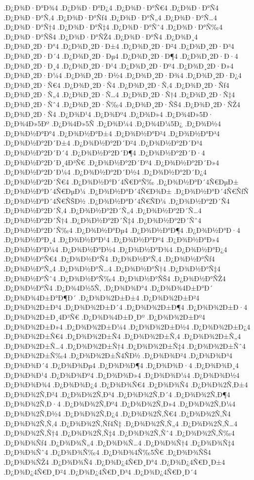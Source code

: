 {.Ð¿Ð¾Ð·Ð°Ð¾4
.Ð¿Ð¾Ð·Ð°Ð¿4
.Ð¿Ð¾Ð·Ð°Ñ€4
.Ð¿Ð¾Ð·Ð°Ñ4
.Ð¿Ð¾Ð·Ð°Ñ‚4
.Ð¿Ð¾Ð·Ð°Ñƒ4
.Ð¿Ð¾Ð·Ð°Ñ„4
.Ð¿Ð¾Ð·Ð°Ñ…4
.Ð¿Ð¾Ð·Ð°Ñ†4
.Ð¿Ð¾Ð·Ð°Ñ‡4
.Ð¿Ð¾Ð·Ð°Ñˆ4
.Ð¿Ð¾Ð·Ð°Ñ‰4
.Ð¿Ð¾Ð·Ð°ÑŠ4
.Ð¿Ð¾Ð·Ð°ÑŽ4
.Ð¿Ð¾Ð·Ð°Ñ4
.Ð¿Ð¾Ð¸4
.Ð¿Ð¾Ð¸2Ð·Ð°4
.Ð¿Ð¾Ð¸2Ð·Ð±4
.Ð¿Ð¾Ð¸2Ð·Ð²4
.Ð¿Ð¾Ð¸2Ð·Ð³4
.Ð¿Ð¾Ð¸2Ð·Ð´4
.Ð¿Ð¾Ð¸2Ð·Ðµ4
.Ð¿Ð¾Ð¸2Ð·Ð¶4
.Ð¿Ð¾Ð¸2Ð·Ð·4
.Ð¿Ð¾Ð¸2Ð·Ð¸4
.Ð¿Ð¾Ð¸2Ð·Ð¹4
.Ð¿Ð¾Ð¸2Ð·Ðº4
.Ð¿Ð¾Ð¸2Ð·Ð»4
.Ð¿Ð¾Ð¸2Ð·Ð¼4
.Ð¿Ð¾Ð¸2Ð·Ð½4
.Ð¿Ð¾Ð¸2Ð·Ð¾4
.Ð¿Ð¾Ð¸2Ð·Ð¿4
.Ð¿Ð¾Ð¸2Ð·Ñ€4
.Ð¿Ð¾Ð¸2Ð·Ñ4
.Ð¿Ð¾Ð¸2Ð·Ñ‚4
.Ð¿Ð¾Ð¸2Ð·Ñƒ4
.Ð¿Ð¾Ð¸2Ð·Ñ„4
.Ð¿Ð¾Ð¸2Ð·Ñ…4
.Ð¿Ð¾Ð¸2Ð·Ñ†4
.Ð¿Ð¾Ð¸2Ð·Ñ‡4
.Ð¿Ð¾Ð¸2Ð·Ñˆ4
.Ð¿Ð¾Ð¸2Ð·Ñ‰4
.Ð¿Ð¾Ð¸2Ð·ÑŠ4
.Ð¿Ð¾Ð¸2Ð·ÑŽ4
.Ð¿Ð¾Ð¸2Ð·Ñ4
.Ð¿Ð¾Ð¹4
.Ð¿Ð¾Ðº4
.Ð¿Ð¾Ð»4
.Ð¿Ð¾4Ð»5Ð·
.Ð¿Ð¾4Ð»5Ðº
.Ð¿Ð¾4Ð»5Ñ
.Ð¿Ð¾Ð¼4
.Ð¿Ð¾4Ð¼5Ð¿
.Ð¿Ð¾Ð½4
.Ð¿Ð¾Ð½Ð°Ð°4
.Ð¿Ð¾Ð½Ð°Ð±4
.Ð¿Ð¾Ð½Ð°Ð²4
.Ð¿Ð¾Ð½Ð°Ð³4
.Ð¿Ð¾Ð½Ð°2Ð´Ð±4
.Ð¿Ð¾Ð½Ð°2Ð´Ð²4
.Ð¿Ð¾Ð½Ð°2Ð´Ð³4
.Ð¿Ð¾Ð½Ð°2Ð´Ð´4
.Ð¿Ð¾Ð½Ð°2Ð´Ð¶4
.Ð¿Ð¾Ð½Ð°2Ð´Ð·4
.Ð¿Ð¾Ð½Ð°2Ð´Ð¸4Ð³Ñ€
.Ð¿Ð¾Ð½Ð°2Ð´Ðº4
.Ð¿Ð¾Ð½Ð°2Ð´Ð»4
.Ð¿Ð¾Ð½Ð°2Ð´Ð¼4
.Ð¿Ð¾Ð½Ð°2Ð´Ð½4
.Ð¿Ð¾Ð½Ð°2Ð´Ð¿4
.Ð¿Ð¾Ð½Ð°2Ð´Ñ€4
.Ð¿Ð¾Ð½Ð°Ð´4Ñ€Ð°Ñ‰
.Ð¿Ð¾Ð½Ð°Ð´4Ñ€ÐµÐ±
.Ð¿Ð¾Ð½Ð°Ð´4Ñ€ÐµÐ¼
.Ð¿Ð¾Ð½Ð°Ð´4Ñ€Ð¾Ð±
.Ð¿Ð¾Ð½Ð°Ð´4Ñ€ÑƒÑ
.Ð¿Ð¾Ð½Ð°Ð´4Ñ€ÑŠÐ½
.Ð¿Ð¾Ð½Ð°Ð´4Ñ€ÑÐ¼
.Ð¿Ð¾Ð½Ð°2Ð´Ñ4
.Ð¿Ð¾Ð½Ð°2Ð´Ñ‚4
.Ð¿Ð¾Ð½Ð°2Ð´Ñ„4
.Ð¿Ð¾Ð½Ð°2Ð´Ñ…4
.Ð¿Ð¾Ð½Ð°2Ð´Ñ†4
.Ð¿Ð¾Ð½Ð°2Ð´Ñ‡4
.Ð¿Ð¾Ð½Ð°2Ð´Ñˆ4
.Ð¿Ð¾Ð½Ð°2Ð´Ñ‰4
.Ð¿Ð¾Ð½Ð°Ðµ4
.Ð¿Ð¾Ð½Ð°Ð¶4
.Ð¿Ð¾Ð½Ð°Ð·4
.Ð¿Ð¾Ð½Ð°Ð¸4
.Ð¿Ð¾Ð½Ð°Ð¹4
.Ð¿Ð¾Ð½Ð°Ðº4
.Ð¿Ð¾Ð½Ð°Ð»4
.Ð¿Ð¾Ð½Ð°Ð¼4
.Ð¿Ð¾Ð½Ð°Ð½4
.Ð¿Ð¾Ð½Ð°Ð¾4
.Ð¿Ð¾Ð½Ð°Ð¿4
.Ð¿Ð¾Ð½Ð°Ñ€4
.Ð¿Ð¾Ð½Ð°Ñ4
.Ð¿Ð¾Ð½Ð°Ñ‚4
.Ð¿Ð¾Ð½Ð°Ñƒ4
.Ð¿Ð¾Ð½Ð°Ñ„4
.Ð¿Ð¾Ð½Ð°Ñ…4
.Ð¿Ð¾Ð½Ð°Ñ†4
.Ð¿Ð¾Ð½Ð°Ñ‡4
.Ð¿Ð¾Ð½Ð°Ñˆ4
.Ð¿Ð¾Ð½Ð°Ñ‰4
.Ð¿Ð¾Ð½Ð°ÑŠ4
.Ð¿Ð¾Ð½Ð°ÑŽ4
.Ð¿Ð¾Ð½Ð°Ñ4
.Ð¿Ð¾4Ð½5Ñ‚
.Ð¿Ð¾Ð¾Ð°4
.Ð¿Ð¾Ð¾4Ð±Ð°Ð´
.Ð¿Ð¾Ð¾4Ð±Ð°Ð¶Ð´
.Ð¿Ð¾Ð¾2Ð±Ð±4
.Ð¿Ð¾Ð¾2Ð±Ð²4
.Ð¿Ð¾Ð¾2Ð±Ð³4
.Ð¿Ð¾Ð¾2Ð±Ð´4
.Ð¿Ð¾Ð¾2Ð±Ð¶4
.Ð¿Ð¾Ð¾2Ð±Ð·4
.Ð¿Ð¾Ð¾2Ð±Ð¸4Ð³Ñ€
.Ð¿Ð¾Ð¾4Ð±Ð¸Ðº
.Ð¿Ð¾Ð¾2Ð±Ðº4
.Ð¿Ð¾Ð¾2Ð±Ð»4
.Ð¿Ð¾Ð¾2Ð±Ð¼4
.Ð¿Ð¾Ð¾2Ð±Ð½4
.Ð¿Ð¾Ð¾2Ð±Ð¿4
.Ð¿Ð¾Ð¾2Ð±Ñ€4
.Ð¿Ð¾Ð¾2Ð±Ñ4
.Ð¿Ð¾Ð¾2Ð±Ñ‚4
.Ð¿Ð¾Ð¾2Ð±Ñ„4
.Ð¿Ð¾Ð¾2Ð±Ñ…4
.Ð¿Ð¾Ð¾2Ð±Ñ†4
.Ð¿Ð¾Ð¾2Ð±Ñ‡4
.Ð¿Ð¾Ð¾2Ð±Ñˆ4
.Ð¿Ð¾Ð¾2Ð±Ñ‰4
.Ð¿Ð¾Ð¾2Ð±Ñ4ÑÐ½
.Ð¿Ð¾Ð¾Ð²4
.Ð¿Ð¾Ð¾Ð³4
.Ð¿Ð¾Ð¾Ð´4
.Ð¿Ð¾Ð¾Ðµ4
.Ð¿Ð¾Ð¾Ð¶4
.Ð¿Ð¾Ð¾Ð·4
.Ð¿Ð¾Ð¾Ð¸4
.Ð¿Ð¾Ð¾Ð¹4
.Ð¿Ð¾Ð¾Ðº4
.Ð¿Ð¾Ð¾Ð»4
.Ð¿Ð¾Ð¾Ð¼4
.Ð¿Ð¾Ð¾Ð½4
.Ð¿Ð¾Ð¾Ð¾4
.Ð¿Ð¾Ð¾Ð¿4
.Ð¿Ð¾Ð¾Ñ€4
.Ð¿Ð¾Ð¾Ñ4
.Ð¿Ð¾Ð¾2Ñ‚Ð±4
.Ð¿Ð¾Ð¾2Ñ‚Ð²4
.Ð¿Ð¾Ð¾2Ñ‚Ð³4
.Ð¿Ð¾Ð¾2Ñ‚Ð´4
.Ð¿Ð¾Ð¾2Ñ‚Ð¶4
.Ð¿Ð¾Ð¾2Ñ‚Ð·4
.Ð¿Ð¾Ð¾2Ñ‚Ðº4
.Ð¿Ð¾Ð¾2Ñ‚Ð»4
.Ð¿Ð¾Ð¾2Ñ‚Ð¼4
.Ð¿Ð¾Ð¾2Ñ‚Ð½4
.Ð¿Ð¾Ð¾2Ñ‚Ð¿4
.Ð¿Ð¾Ð¾2Ñ‚Ñ€4
.Ð¿Ð¾Ð¾2Ñ‚Ñ4
.Ð¿Ð¾Ð¾2Ñ‚Ñ‚4
.Ð¿Ð¾Ð¾2Ñ‚Ñƒ4Ñ‡
.Ð¿Ð¾Ð¾2Ñ‚Ñ„4
.Ð¿Ð¾Ð¾2Ñ‚Ñ…4
.Ð¿Ð¾Ð¾2Ñ‚Ñ†4
.Ð¿Ð¾Ð¾2Ñ‚Ñ‡4
.Ð¿Ð¾Ð¾2Ñ‚Ñˆ4
.Ð¿Ð¾Ð¾2Ñ‚Ñ‰4
.Ð¿Ð¾Ð¾Ñƒ4
.Ð¿Ð¾Ð¾Ñ„4
.Ð¿Ð¾Ð¾Ñ…4
.Ð¿Ð¾Ð¾Ñ†4
.Ð¿Ð¾Ð¾Ñ‡4
.Ð¿Ð¾Ð¾Ñˆ4
.Ð¿Ð¾Ð¾Ñ‰4
.Ð¿Ð¾Ð¾4Ñ‰5Ñ€
.Ð¿Ð¾Ð¾ÑŠ4
.Ð¿Ð¾Ð¾ÑŽ4
.Ð¿Ð¾Ð¾Ñ4
.Ð¿Ð¾Ð¿4Ñ€Ð¸Ð°4
.Ð¿Ð¾Ð¿4Ñ€Ð¸Ð±4
.Ð¿Ð¾Ð¿4Ñ€Ð¸Ð²4
.Ð¿Ð¾Ð¿4Ñ€Ð¸Ð³4
.Ð¿Ð¾Ð¿4Ñ€Ð¸Ð´4
}
